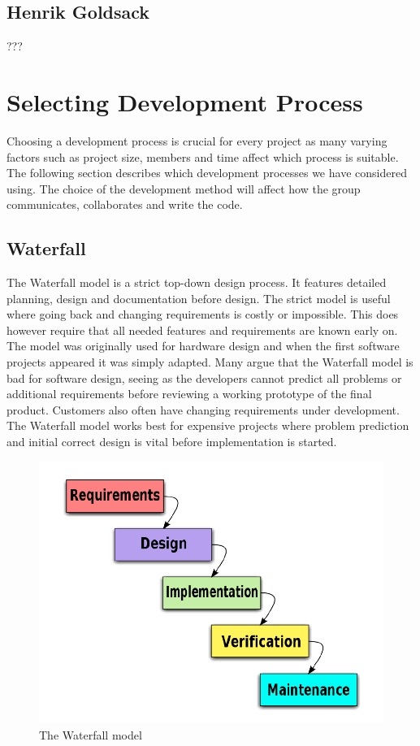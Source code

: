 \subsection{Henrik Goldsack}
???

\newpage
\section{Selecting Development Process}
Choosing a development process is crucial for every project as many varying factors such as
project size, members and time affect which process is suitable. The following section describes
which development processes we have considered using. The choice of the development method
will affect how the group communicates, collaborates and write the code.

\subsection{Waterfall}
The Waterfall model is a strict top-down design process. It features detailed planning, design and
documentation before design. The strict model is useful where going back and changing requirements is 
costly or impossible. This does however require that all needed features and requirements are known
early on. The model was originally used for hardware design and when the first software projects 
appeared it was simply adapted. Many argue that the Waterfall model is bad for software design, seeing
as the developers cannot predict all problems or additional requirements before reviewing a working
prototype of the final product. Customers also often have changing requirements under development.
The Waterfall model works best for expensive projects where problem prediction and initial correct design
is vital before implementation is started.
\begin{figure}[h!]
\centering \includegraphics[scale=0.30]{img/designmodel-waterwall} \caption{The Waterfall model}
\label{fig:desigmodel-waterfall}
\end{figure}


